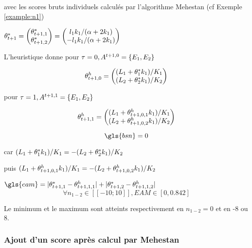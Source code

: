 avec les scores bruts individuels calculés par l'algorithme Mehestan (cf Exemple \ref{example:n1})

$\theta^*_{t+1}= \begin{pmatrix}
\theta^*_{t+1,1} \\
\theta^*_{t+1,2} 
\end{pmatrix}=
\begin{pmatrix}
l_1k_1 / (\alpha + 2k_1)\\
-l_1k_1 / (\alpha + 2k_1)\\
\end{pmatrix}$

L'heuristique donne pour $\tau=0, A^{t+1,0}=\left\lbrace E_1,E_2 \right\rbrace$

\begin{equation*}
\theta^h_{t+1,0}= \begin{pmatrix}
(L_1+\theta^*_{1} k_1) / K_1 \\
(L_2+\theta^*_{2} k_1) / K_2
\end{pmatrix}
\end{equation*}

pour $\tau=1, A^{t+1,1}=\left\lbrace E_1,E_2 \right\rbrace$


\begin{equation*}
\theta^h_{t+1,1}= \begin{pmatrix}
(L_1+\theta^h_{t+1,0,1} k_1) / K_1 \\
(L_2+\theta^h_{t+1,0,2} k_1) / K_2
\end{pmatrix}
\end{equation*}

\begin{equation*}
\gls{bsn}=0
\end{equation*}


car  $(L_1+\theta^*_{1} k_1) / K_1 = -(L_2+\theta^*_{2} k_1) / K_2$

puis 
$(L_1+\theta^h_{t+1,0,1} k_1) / K_1 = -(L_2+\theta^h_{t+1,0,2} k_1) / K_2 $

$\gls{eam}=  |\score_{t+1,1} - \scoreh_{t+1,1,1}|   +  |\score_{t+1,2} - \scoreh_{t+1,1,2}| $
\begin{equation*}
\forall{n_{1-2}}\in [\![-10;10]\!], EAM \in [0,0.842]
\end{equation*}

Le minimum et le maximum sont atteints respectivement en $n_{1-2}=0$ et en -8 ou 8.


\subsubsection{Ajout d'un score après calcul par Mehestan}


